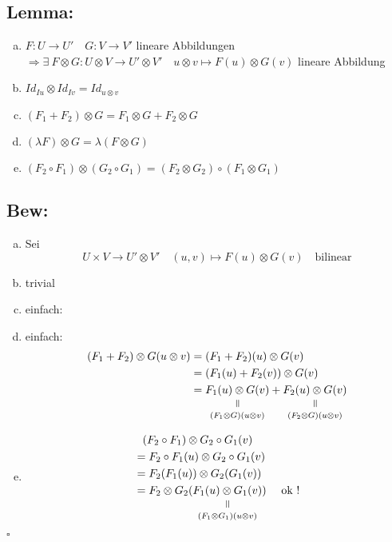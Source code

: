 \documentclass[titlepage,12pt,a4paper,ngerman]{report}
\newenvironment{bew}[1]{\subsection{Bew: #1}}{\hfill$\square$}
\newcommand{\Bew}[2]{\begin{bew}{#1}#2\end{bew}}
\newcommand{\verteq}{\rotatebox{90}{$\,=$}}
\newcommand{\equalto}[2]{\underset{\scriptstyle\overset{\mkern4mu\verteq}{#2}}{#1}}
\newcommand{\tx}[1]{\textrm{#1}}
\begin{document}
\subsection{Lemma:}
\begin{enumerate}[a)]
	\item $ F: U \to U'  \quad G: V \to V' $ lineare Abbildungen\\
	$ \Rightarrow \exists \ F \otimes G: U \otimes V \to U' \otimes V' \quad u \otimes v \mapsto F(u) \otimes G(v) $ lineare Abbildung
	\item $ Id_{Iu} \otimes Id_{Iv} = Id_{u \otimes v} $
	\item $ (F_1 + F_2) \otimes G = F_1 \otimes G + F_2 \otimes G $
	\item $ (\lambda F) \otimes G = \lambda (F \otimes G) $
	\item $ (F_2 \circ F_1) \otimes (G_2 \circ G_1) = (F_2 \otimes G_2) \circ (F_1 \otimes G_1) $
\end{enumerate}


\Bew{}{
\begin{enumerate}[a)]
	\item Sei $$U \times V \to U' \otimes V' \quad (u,v) \mapsto F(u) \otimes G(v) \quad \tx{bilinear}$$
	
	
	\item trivial
	\item einfach:
	\item einfach:
	\begin{align*}
	(F_1+F_2) \otimes G(u\otimes v) &= (F_1 + F_2) (u) \otimes G(v)\\
	&=(F_1(u) + F_2(v)) \otimes G(v)\\
	&=\equalto{ F_1(u) \otimes G(v) }{(F_1 \otimes G) (u \otimes v)} + \equalto{ F_2(u) \otimes G(v) }{(F_2 \otimes G) (u \otimes v)}
	\end{align*}
	\item \begin{align*}
	&\phantom{=} (F_2 \circ F_1) \otimes G_2 \circ G_1 (v)\\
	&= F_2 \circ F_1 (u) \otimes G_2 \circ G_1 (v)\\
	&= F_2 (F_1(u)) \otimes G_2(G_1(v))\\
	&= F_2 \otimes G_2 \equalto{(F_1(u) \otimes G_1(v))}{(F_1 \otimes G_1) (u \otimes v)} \quad \tx{ ok !}
	\end{align*}
\end{enumerate}

}

	 
\end{document}
